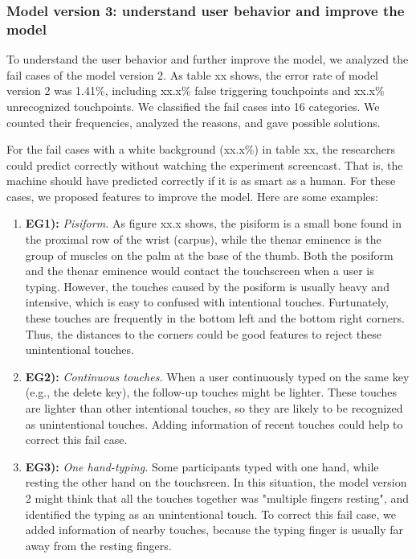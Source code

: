 \subsubsection{Model version 3: understand user behavior and  improve the model}

To understand the user behavior and further improve the model, we analyzed the fail cases of the model version 2. As table xx shows, the error rate of model version 2 was 1.41\%, including xx.x\% false triggering touchpoints and xx.x\% unrecognized touchpoints. We classified the fail cases into 16 categories. We counted their frequencies, analyzed the reasons, and gave possible solutions.

For the fail cases with a white background (xx.x\%) in table xx, the researchers could predict correctly without watching the experiment screencast. That is, the machine should have predicted correctly if it is as smart as a human. For these cases, we proposed features to improve the model. Here are some examples:


\begin{enumerate}
	\item{\textbf{EG1):} \emph{Pisiform.} As figure xx.x shows, the pisiform is a small bone found in the proximal row of the wrist (carpus), while the thenar eminence is the group of muscles on the palm at the base of the thumb. Both the posiform and the thenar eminence would contact the touchscreen when a user is typing. However, the touches caused by the posiform is usually heavy and intensive, which is easy to confused with intentional touches. Furtunately, these touches are frequently in the bottom left and the bottom right corners. Thus, the distances to the corners could be good features to reject these unintentional touches.}
	\item{\textbf{EG2):} \emph{Continuous touches.} When a user continuously typed on the same key (e.g., the delete key), the follow-up touches might be lighter. These touches are lighter than other intentional touches, so they are likely to be recognized as unintentional touches. Adding information of recent touches could help to correct this fail case.}
	\item{\textbf{EG3):} \emph{One hand-typing.} Some participants typed with one hand, while resting the other hand on the touchsreen. In this situation, the model version 2 might think that all the touches together was "multiple fingers resting", and identified the typing as an unintentional touch. To correct this fail case, we added information of nearby touches, because the typing finger is usually far away from the resting fingers.}
\end{enumerate}


